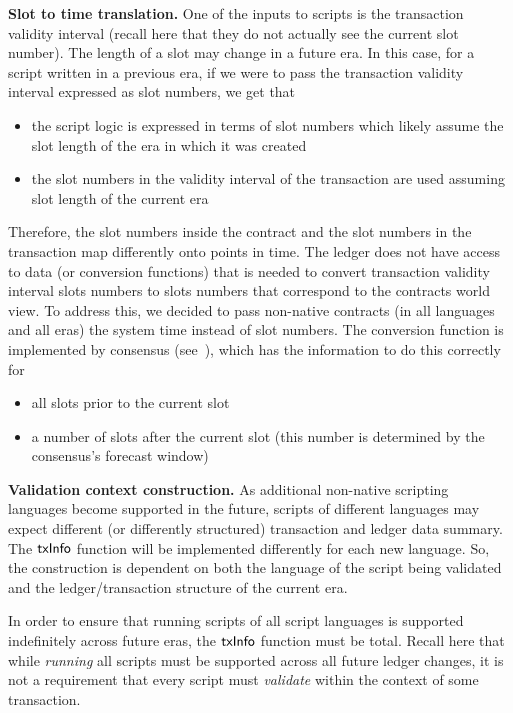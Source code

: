 \textbf{Slot to time translation.}
One of the inputs to scripts is the transaction validity interval (recall here that
they do not actually see the current slot number). The length of a
slot may change in a future era. In this case, for a script written in a previous
era, if we were to pass the transaction validity interval expressed as slot numbers,
we get that

\begin{itemize}
  \item the script logic is expressed in terms of slot numbers
  which likely assume the slot length of the era in which it was created
  \item the slot numbers in the validity interval of the transaction are used
  assuming slot length of the current era
\end{itemize}

Therefore, the slot numbers inside the contract and the slot numbers in the transaction
map differently onto points in time. The ledger does not have access to data (or conversion functions)
that is needed to convert transaction validity interval slots numbers to slots numbers
that correspond to the contracts world view. To address this, we decided to pass
non-native contracts (in all languages and all eras) the system time instead of slot numbers.
The conversion function is implemented by consensus (see~\cite{shelley_consensus}),
which has the information to do this correctly for

\begin{itemize}
  \item all slots prior to the current slot
  \item a number of slots after the current slot (this number is determined by
  the consensus's forecast window)
\end{itemize}

\textbf{Validation context construction.}
  As additional non-native scripting languages become supported in the future, scripts of different
  languages may expect different (or differently structured) transaction and ledger data summary.
  The $\mathsf{txInfo}$ function will be implemented differently
  for each new language. So, the construction is
  dependent on both the language of the script being validated and the ledger/transaction structure
  of the current era.

  In order to ensure that running scripts of all script languages is supported indefinitely across
  future eras, the $\mathsf{txInfo}$ function must be total.
  Recall here that while \emph{running} all scripts must be supported across
  all future ledger changes,
  it is not a requirement that every script must \emph{validate} within the context of some transaction.


